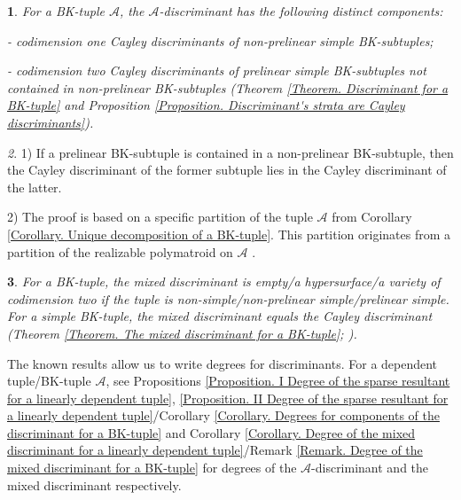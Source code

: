 \documentclass[11pt]{article}
\theoremstyle{plain}
\newtheorem{thm}{\protect\theoremname}[section]
\theoremstyle{definition}
\theoremstyle{remark}
\newtheorem{rem}[thm]{\protect\remarkname}
\theoremstyle{plain}
\theoremstyle{plain}
\theoremstyle{plain}
\theoremstyle{definition}
\providecommand{\remarkname}{Remark}
\providecommand{\theoremname}{Theorem}
\begin{document}
\begin{thm}
\label{Theorem. Introduction. Discriminants for linearly independent tuples}
For a BK-tuple $\mathscr{A}$, the $\mathscr{A}$-discriminant has
the following distinct components:

- codimension one Cayley discriminants of non-prelinear simple BK-subtuples;

- codimension two Cayley discriminants of prelinear simple BK-subtuples
not contained in non-prelinear BK-subtuples \textup{(Theorem \ref{Theorem. Discriminant for a BK-tuple}
and Proposition \ref{Proposition. Discriminant's strata are Cayley discriminants})}.
\end{thm}

\begin{rem}
1) If a prelinear BK-subtuple is contained in a non-prelinear BK-subtuple,
then the Cayley discriminant of the former subtuple lies in the Cayley
discriminant of the latter.

2) The proof is based on a specific partition of the tuple $\mathscr{A}$
from Corollary \ref{Corollary. Unique decomposition of a BK-tuple}.
This partition originates from a partition of the realizable polymatroid
on $\mathscr{A}$ \cite{pokidkin_combinatorics_2025}.
\end{rem}

\begin{thm}
For a BK-tuple, the mixed discriminant is empty/a hypersurface/a variety
of codimension two if the tuple is non-simple/non-prelinear simple/prelinear
simple. For a simple BK-tuple, the mixed discriminant equals the Cayley
discriminant \textup{(Theorem \ref{Theorem. The mixed discriminant for a BK-tuple};
\cite{cattani_mixed_2013})}.
\end{thm}

The known results \cite{pedersen_product_1993,gelfand_discriminants_1994,dickenstein_tropical_2007,esterov_determinantal_2007,matsui_geometric_2011}
allow us to write degrees for discriminants. For a dependent tuple/BK-tuple
$\mathscr{A}$, see Propositions \ref{Proposition. I Degree of the sparse resultant for a linearly dependent tuple},
\ref{Proposition. II Degree of the sparse resultant for a linearly dependent tuple}/Corollary
\ref{Corollary. Degrees for components of the discriminant for a BK-tuple}
and Corollary \ref{Corollary. Degree of the mixed discriminant for a linearly dependent tuple}/Remark
\ref{Remark. Degree of the mixed discriminant for a BK-tuple} for
degrees of the $\mathscr{A}$-discriminant and the mixed discriminant
respectively.
\end{document}
